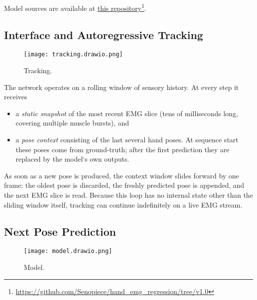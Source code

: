 Model sources are available at \href{https://github.com/Senopiece/hand_emg_regression/tree/v1.0}{this repository}\footnote{\url{https://github.com/Senopiece/hand_emg_regression/tree/v1.0}}.

\subsection{Interface and Autoregressive Tracking}

\begin{figure}[H]
    \centering
    \texttt{[image: tracking.drawio.png]}
    \caption{Tracking.}
    \label{fig:tracking}
\end{figure}

The network operates on a rolling window of sensory history.
At every step it receives

\begin{itemize}
  \item a \emph{static snapshot} of the most recent EMG slice
        (tens of milliseconds long, covering multiple muscle bursts), and
  \item a \emph{pose context} consisting of the last several hand poses.
        At sequence start these poses come from ground-truth; after the first
        prediction they are replaced by the model`s own outputs.
\end{itemize}

As soon as a new pose is produced, the context window slides forward by one frame: the oldest pose is discarded, the freshly predicted pose is appended, and the next EMG slice is read. Because this loop has no internal state other than the sliding window itself, tracking can continue indefinitely on a live EMG stream.

\subsection{Next Pose Prediction}

\begin{figure}[H]
    \centering
    \texttt{[image: model.drawio.png]}
    \caption{Model.}
    \label{fig:model}
\end{figure}

